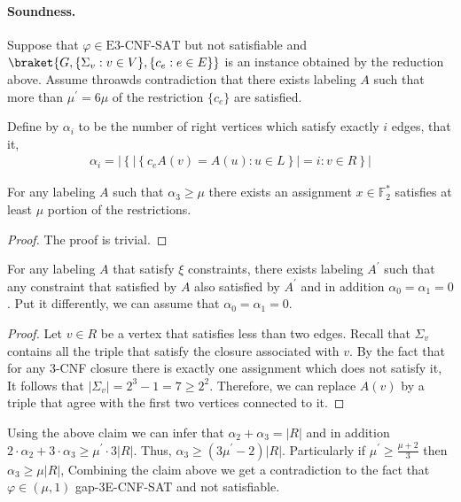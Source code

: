 \documentclass{article}
\begin{document}
\paragraph{Soundness.} Suppose that $\varphi \in \text{E3-CNF-SAT}$ but not satisfiable and $\braket{G, \{ \Sigma_{v} : v \in V \}, \{c_{e} : e \in E \}} $ is an instance obtained by the reduction above. Assume throawds contradiction that there exists labeling $A$ such that more than $\mu^{\prime}= 6\mu$ of the restriction $\{c_{e}\}$ are satisfied. 

Define by $\alpha_{i}$ to be the number of right vertices which satisfy exactly $i$ edges, that it, 
\begin{equation*}
  \begin{split}
    \alpha_{i} = \left| \left\{ | \left\{ c_{e}A\left( v \right) = A\left( u \right) : u \in L \right\} | = i : v \in R   \right\} \right| 
  \end{split}
\end{equation*}

\begin{claim}
  For any labeling $A$ such that $\alpha_{3} \ge \mu$ there exists an assignment $x \in \mathbb{F}_{2}^{*}$ satisfies at least $\mu$ portion of the restrictions. 
\end{claim}

\begin{proof}
  The proof is trivial. 
\end{proof}

\begin{claim}
  For any labeling $A$ that satisfy $\xi$ constraints, there exists labeling $A^{\prime}$ such that any constraint that satisfied by $A$ also satisfied by $A^{\prime}$ and in addition $\alpha_{0}=\alpha_{1}=0$. Put it differently, we can assume that $\alpha_{0}=\alpha_{1}=0$.
\end{claim}

\begin{proof}
  Let $v \in R$ be a vertex that satisfies less than two edges. Recall that $\Sigma_{v}$ contains all the triple that satisfy the closure associated with $v$. By the fact that for any 3-CNF closure there is exactly one assignment which does not satisfy it, It follows that $|\Sigma_{v}| = 2^{3}-1 = 7 \ge 2^{2}$. Therefore, we can replace $A(v)$ by a triple that agree with the first two vertices connected to it.     
\end{proof}

Using the above claim we can infer that $\alpha_{2} + \alpha_{3} = |R|$ and in addition $2\cdot \alpha_{2} + 3 \cdot \alpha_{3} \ge \mu^{\prime} \cdot 3|R|$. Thus, $\alpha_{3}\ge \left( 3\mu^{\prime} - 2 \right)|R|$. 
Particularly if $\mu^{\prime} \ge \frac{\mu + 2}{3}$ then $\alpha_{3} \ge \mu|R|$, Combining the claim above we get a contradiction to the fact that $\varphi \in\left( \mu,1 \right)$ gap-3E-CNF-SAT and not satisfiable. 
\end{document}
